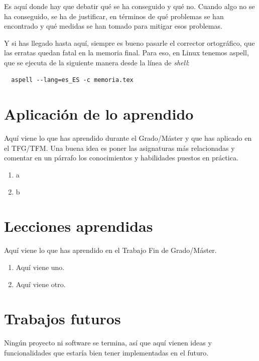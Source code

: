 \documentclass[a4paper, 12pt]{book}
\begin{document}
Es aquí donde hay que debatir qué se ha conseguido y qué no. 
Cuando algo no se ha conseguido, se ha de justificar, en términos de qué problemas se han encontrado y qué medidas se han tomado para mitigar esos problemas.

Y si has llegado hasta aquí, siempre es bueno pasarle el corrector ortográfico, que las erratas quedan fatal en la memoria final.
Para eso, en Linux tenemos aspell, que se ejecuta de la siguiente manera desde la línea de \emph{shell}:

\begin{verbatim}
  aspell --lang=es_ES -c memoria.tex
\end{verbatim}

\section{Aplicación de lo aprendido}
\label{sec:aplicacion}

Aquí viene lo que has aprendido durante el Grado/Máster y que has aplicado en el TFG/TFM.
Una buena idea es poner las asignaturas más relacionadas y comentar en un párrafo los conocimientos y habilidades puestos en práctica.

\begin{enumerate}
  \item a
  \item b
\end{enumerate}


\section{Lecciones aprendidas}
\label{sec:lecciones_aprendidas}

Aquí viene lo que has aprendido en el Trabajo Fin de Grado/Máster.

\begin{enumerate}
  \item Aquí viene uno.
  \item Aquí viene otro.
\end{enumerate}


\section{Trabajos futuros}
\label{sec:trabajos_futuros}

Ningún proyecto ni software se termina, así que aquí vienen ideas y funcionalidades que estaría bien tener implementadas en el futuro.
\end{document}
